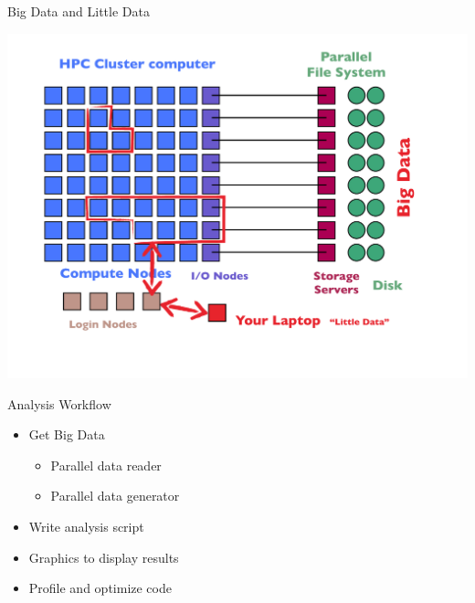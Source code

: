 \begin{frame}{Big Data and Little Data}
\begin{minipage}{10cm}
  \includegraphics[width=1.2\textheight]
  {../common/pics/hardware/ParallelHardware22.pdf}\hfill
\end{minipage}
\begin{minipage}{5cm}\small
  \begin{block}{Analysis Workflow}\pause
    \begin{itemize}[<+-|alert@+>]
    \item Get Big Data
      \begin{itemize}
      \item Parallel data reader
      \item Parallel data generator
      \end{itemize}
    \item Write analysis script
    \item Graphics to display results
    \item Profile and optimize code
    \end{itemize}
  \end{block}
\end{minipage}
\end{frame}

